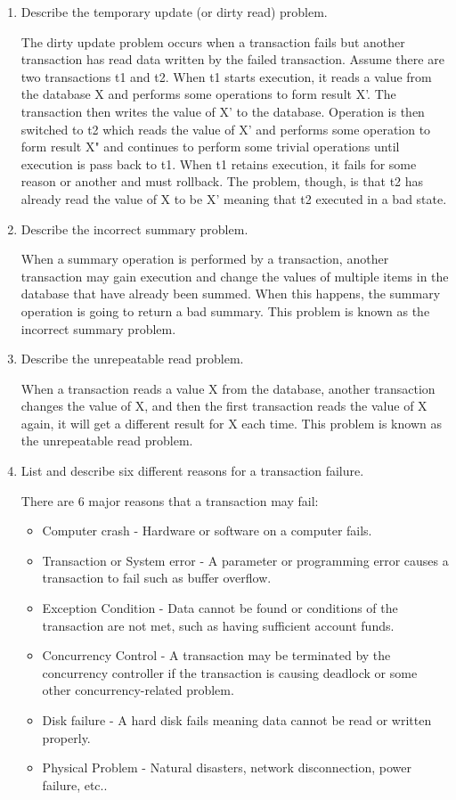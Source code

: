 \documentclass[11pt]{article}
\begin{document}
\begin{enumerate}
		\item Describe the temporary update (or dirty read) problem.
		
		The dirty update problem occurs when a transaction fails but another transaction has read data written by the failed transaction. Assume there are two transactions t1 and t2. When t1 starts execution, it reads a value from the database X and performs some operations to form result X'. The transaction then writes the value of X' to the database. Operation is then switched to t2 which reads the value of X' and performs some operation to form result X" and continues to perform some trivial operations until execution is pass back to t1. When t1 retains execution, it fails for some reason or another and must rollback. The problem, though, is that t2 has already read the value of X to be X' meaning that t2 executed in a bad state.
		
		\item Describe the incorrect summary problem.
		
		When a summary operation is performed by a transaction, another transaction may gain execution and change the values of multiple items in the database that have already been summed. When this happens, the summary operation is going to return a bad summary. This problem is known as the incorrect summary problem.
		
		\item Describe the unrepeatable read problem.
		
		When a transaction reads a value X from the database, another transaction changes the value of X, and then the first transaction reads the value of X again, it will get a different result for X each time. This problem is known as the unrepeatable read problem.
		
		\item List and describe six different reasons for a transaction failure.
		
		There are 6 major reasons that a transaction may fail:
		\begin{itemize}
			\item Computer crash - Hardware or software on a computer fails.
			\item Transaction or System error - A parameter or programming error causes a transaction to fail such as buffer overflow.
			\item Exception Condition - Data cannot be found or conditions of the transaction are not met, such as having sufficient account funds.
			\item Concurrency Control - A transaction may be terminated by the concurrency controller if the transaction is causing deadlock or some other concurrency-related problem.
			\item Disk failure - A hard disk fails meaning data cannot be read or written properly.
			\item Physical Problem - Natural disasters, network disconnection, power failure, etc..
		\end{itemize}
		

\end{enumerate}
\end{document}
